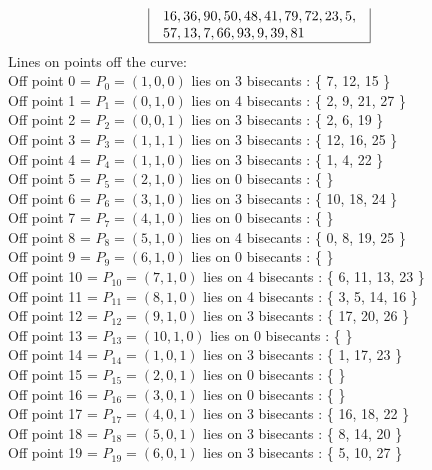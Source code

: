 \documentclass{article}
\begin{document}
{$$\begin{array}{|r|r|l|}
\begin{array}{l}
16, 36, 90, 50, 48, 41, 79, 72, 23, 5, \\
57, 13, 7, 66, 93, 9, 39, 81\end{array}
\\
\hline
\end{array}
$$
Lines on points off the curve:\\
Off point 0 = $P_{0} = ( 1, 0, 0 )$ lies on 3 bisecants : \{ 7, 12, 15 \}\\
Off point 1 = $P_{1} = ( 0, 1, 0 )$ lies on 4 bisecants : \{ 2, 9, 21, 27 \}\\
Off point 2 = $P_{2} = ( 0, 0, 1 )$ lies on 3 bisecants : \{ 2, 6, 19 \}\\
Off point 3 = $P_{3} = ( 1, 1, 1 )$ lies on 3 bisecants : \{ 12, 16, 25 \}\\
Off point 4 = $P_{4} = ( 1, 1, 0 )$ lies on 3 bisecants : \{ 1, 4, 22 \}\\
Off point 5 = $P_{5} = ( 2, 1, 0 )$ lies on 0 bisecants : \{  \}\\
Off point 6 = $P_{6} = ( 3, 1, 0 )$ lies on 3 bisecants : \{ 10, 18, 24 \}\\
Off point 7 = $P_{7} = ( 4, 1, 0 )$ lies on 0 bisecants : \{  \}\\
Off point 8 = $P_{8} = ( 5, 1, 0 )$ lies on 4 bisecants : \{ 0, 8, 19, 25 \}\\
Off point 9 = $P_{9} = ( 6, 1, 0 )$ lies on 0 bisecants : \{  \}\\
Off point 10 = $P_{10} = ( 7, 1, 0 )$ lies on 4 bisecants : \{ 6, 11, 13, 23 \}\\
Off point 11 = $P_{11} = ( 8, 1, 0 )$ lies on 4 bisecants : \{ 3, 5, 14, 16 \}\\
Off point 12 = $P_{12} = ( 9, 1, 0 )$ lies on 3 bisecants : \{ 17, 20, 26 \}\\
Off point 13 = $P_{13} = ( 10, 1, 0 )$ lies on 0 bisecants : \{  \}\\
Off point 14 = $P_{14} = ( 1, 0, 1 )$ lies on 3 bisecants : \{ 1, 17, 23 \}\\
Off point 15 = $P_{15} = ( 2, 0, 1 )$ lies on 0 bisecants : \{  \}\\
Off point 16 = $P_{16} = ( 3, 0, 1 )$ lies on 0 bisecants : \{  \}\\
Off point 17 = $P_{17} = ( 4, 0, 1 )$ lies on 3 bisecants : \{ 16, 18, 22 \}\\
Off point 18 = $P_{18} = ( 5, 0, 1 )$ lies on 3 bisecants : \{ 8, 14, 20 \}\\
Off point 19 = $P_{19} = ( 6, 0, 1 )$ lies on 3 bisecants : \{ 5, 10, 27 \}\\
}
\end{document}
